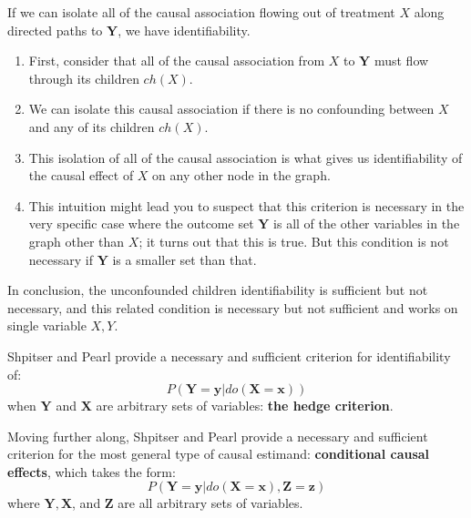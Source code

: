 If we can isolate all of the causal association flowing out of treatment $X$ along
directed paths to $\mathbf{Y}$, we have identifiability.
\begin{enumerate}
    \item First, consider that all of the causal association from $X$ to $\mathbf{Y}$
          must flow through its children $ch(X)$.
    \item We can isolate this causal association if there is no confounding between
          $X$ and any of its children $ch(X)$.
    \item This isolation of all of the causal association is what gives us
          identifiability of the causal effect of $X$ on any other node in the graph.
    \item This intuition might lead you to suspect that this criterion is necessary
          in the very specific case where the outcome set $\mathbf{Y}$ is all of
          the other variables in the graph other than $X$; it turns out that this
          is true. But this condition is not necessary if $\mathbf{Y}$ is a smaller
          set than that.
\end{enumerate}

In conclusion, the unconfounded children identifiability is sufficient but not
necessary, and this related condition is necessary but not sufficient and works
on single variable $X, Y$.

Shpitser and Pearl provide a necessary and sufficient criterion for identifiability of:
\begin{equation}
    P(\mathbf{Y} = \mathbf{y}|do(\mathbf{X} = \mathbf{x}))
\end{equation}
when $\mathbf{Y}$ and $\mathbf{X}$ are arbitrary sets of variables: \textbf{the hedge criterion}.

Moving further along, Shpitser and Pearl provide a necessary and sufficient criterion
for the most general type of causal estimand: \textbf{conditional causal effects},
which takes the form:
\begin{equation}
    P(\mathbf{Y} = \mathbf{y}|do(\mathbf{X} = \mathbf{x}), \mathbf{Z} = \mathbf{z})
\end{equation}
where $\mathbf{Y}, \mathbf{X}$, and $\mathbf{Z}$ are all arbitrary sets of variables.